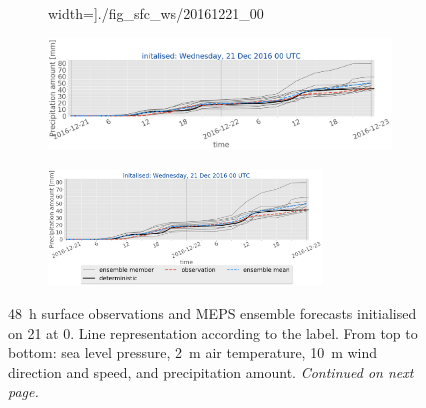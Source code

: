 \begin{figure}[H]
\begin{subfigure}[b]{0.93\textwidth}
		width=\textwidth]{./fig_sfc_ws/20161221_00}
		\caption{}\label{fig:res:sfc_ws21}
	\end{subfigure}
	\begin{subfigure}[b]{0.93\textwidth}
		\includegraphics[trim={0.cm 1.5cm 0cm 0cm},clip,
		width=\textwidth]{./fig_sfc_precip/20161221_00}
		\caption{}\label{fig:res:sfc_precip21}
	\end{subfigure}
	\begin{subfigure}[b]{\textwidth}
		\centering
		\includegraphics[trim={5.5cm 0cm 5.cm 17.7cm},clip,
		width=0.8\textwidth]{./fig_sfc_precip/20161221_00_label}
	\end{subfigure}
	\caption{\SI{48}{\hour} surface observations and MEPS ensemble forecasts initialised on \SI{21}{\dec} at \SI{0}{\UTC}. 
		Line representation according to the label. From top to bottom: sea level pressure, \SI{2}{\metre} air temperature, \SI{10}{\metre} wind direction and speed, and precipitation amount. \textit{Continued on next page.}}\label{fig:obs_meps:21}
\end{figure}
